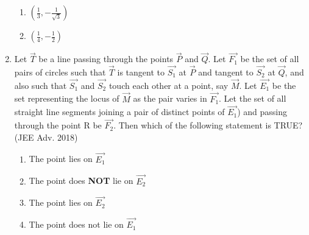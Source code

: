 \documentclass[journal,12pt,twocolumn]{IEEEtran}
\theoremstyle{remark}
\begin{document}
\begin{enumerate}
\begin{enumerate}[label=(\alph*)]
\item $\left(\frac{1}{3}, -\frac{1}{\sqrt{3}} \right)$
\item $\left(\frac{1}{4}, -\frac{1}{2}\right)$
\end{enumerate}
\item Let $\vec{T}$ be a line passing through the points $\vec{P}$ and $\vec{Q}$. Let $\vec{F_1}$ be the set of all pairs of circles  such that $\vec{T}$ is tangent to $\vec{S_1}$ at $\vec{P}$ and tangent to $\vec{S_2}$ at $\vec{Q}$, and also such that $\vec{S_1}$ and $\vec{S_2}$ touch each other at a point, say $\vec{M}$. Let $\vec{E_1}$ be the set representing the locus of $\vec{M}$ as the pair  varies in $\vec{F_1}$. Let the set of all straight line segments joining a pair of distinct points of $\vec{E_1}$) and passing through the point R be $\vec{F_2}$. Then which of the following statement is  TRUE?
\hfill{(JEE Adv. 2018)}
\begin{enumerate}
\item The point  lies on $\vec{E_1}$
\item The point  does \textbf{NOT} lie on $\vec{E_2}$
\item The point  lies on $\vec{E_2}$
\item The point  does not lie on $\vec{E_1}$
\end{enumerate}
\end{enumerate}
\end{document}
